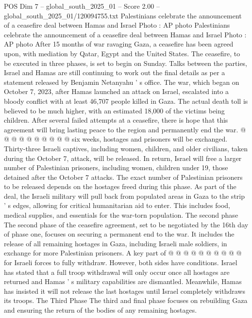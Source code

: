 \begin{textsample}{POS Dim 7 – global\_south\_2025\_01 – Score 2.00 – global\_south\_2025\_01/120094755.txt}  \label{ex:f7_pos_252}
Palestinians celebrate the announcement of a ceasefire deal between Hamas and Israel Photo : AP photo Palestinians celebrate the announcement of a ceasefire deal between Hamas and Israel Photo : AP photo After 15 months of war ravaging Gaza, a ceasefire has been agreed upon, with mediation by Qatar, Egypt and the United States.
The ceasefire, to be executed in three phases, is set to begin on Sunday.
Talks between the parties, Israel and Hamas are still continuing to work out the final details as per a statement released by Benjamin Netanyahu ' s office.
The war, which began on October 7, 2023, after Hamas launched an attack on Israel, escalated into a bloody conflict with at least 46,707 people killed in Gaza.
The actual death toll is believed to be much higher, with an estimated 18,000 of the victims being children.
After several failed attempts at a ceasefire, there is hope that this agreement will bring lasting peace to the region and permanently end the war. @ @ @ @ @ @ @ @ @ @ six weeks, hostages and prisoners will be exchanged.
Thirty-three Israeli captives, including women, children, and older civilians, taken during the October 7, attack, will be released.
In return, Israel will free a larger number of Palestinian prisoners, including women, children under 19, those detained after the October 7 attacks.
The exact number of Palestinian prisoners to be released depends on the hostages freed during this phase.
As part of the deal, the Israeli military will pull back from populated areas in Gaza to the strip ' s edges, allowing for critical humanitarian aid to enter.
This includes food, medical supplies, and essentials for the war-torn population.
The second phase The second phase of the ceasefire agreement, set to be negotiated by the 16th day of phase one, focuses on securing a permanent end to the war.
It includes the release of all remaining hostages in Gaza, including Israeli male soldiers, in exchange for more Palestinian prisoners.
A key part of @ @ @ @ @ @ @ @ @ @ for Israeli forces to fully withdraw.
However, both sides have conditions.
Israel has stated that a full troop withdrawal will only occur once all hostages are returned and Hamas ' s military capabilities are dismantled.
Meanwhile, Hamas has insisted it will not release the last hostages until Israel completely withdraws its troops.
The Third Phase The third and final phase focuses on rebuilding Gaza and ensuring the return of the bodies of any remaining hostages.

\end{textsample}

